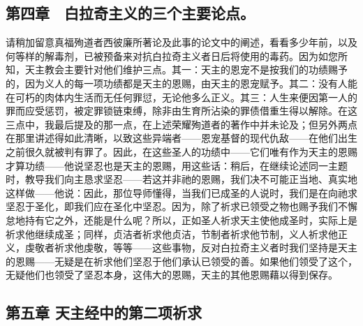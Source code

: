 
\subsection{第四章　白拉奇主义的三个主要论点。}

请稍加留意真福殉道者西彼廉所著论及此事的论文中的阐述，看看多少年前，以及何等样的解毒剂，已被预备来对抗白拉奇主义者日后将使用的毒药。因为如您所知，天主教会主要针对他们维护三点。其一：天主的恩宠不是按我们的功绩赐予的，因为义人的每一项功绩都是天主的恩赐，由天主的恩宠赋予。其二：没有人能在可朽的肉体内生活而无任何罪愆，无论他多么正义。其三：人生来便因第一人的罪而应受惩罚，被定罪锁链束缚，除非由生育所沾染的罪债借重生得以解除。在这三点中，我最后提及的那一点，在上述荣耀殉道者的著作中并未论及；但另外两点在那里讲述得如此清晰，以致这些异端者——恩宠基督的现代仇敌——在他们出生之前很久就被判有罪了。因此，在这些圣人的功绩中——它们唯有作为天主的恩赐才算功绩——他说坚忍也是天主的恩赐，用这些话：稍后，在继续论述同一主题时，教导我们向主恳求坚忍——若这并非祂的恩赐，我们决不可能正当地、真实地这样做——他说：因此，那位导师懂得，当我们已成圣的人说时，我们是在向祂求坚忍于圣化，即我们应在圣化中坚忍。因为，除了祈求已领受之物也赐予我们不懈怠地持有它之外，还能是什么呢？所以，正如圣人祈求天主使他成圣时，实际上是祈求他继续成圣；同样，贞洁者祈求他贞洁，节制者祈求他节制，义人祈求他正义，虔敬者祈求他虔敬，等等——这些事物，反对白拉奇主义者时我们坚持是天主的恩赐——无疑是在祈求他们坚忍于他们承认已领受的善。如果他们领受了这个，无疑他们也领受了坚忍本身，这伟大的恩赐，天主的其他恩赐藉以得到保存。\par


\subsection{第五章 天主经中的第二项祈求}

